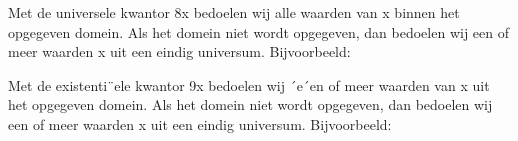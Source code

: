 \documentclass{article}
\begin{document}
	
	
	Met de universele kwantor 8x bedoelen wij alle waarden van x binnen het opgegeven
	domein. Als het domein niet wordt opgegeven, dan bedoelen wij een of meer waarden x
	uit een eindig universum. Bijvoorbeeld:
	
	
	Met de existenti¨ele kwantor 9x bedoelen wij ´e´en of meer waarden van x uit het opgegeven
	domein. Als het domein niet wordt opgegeven, dan bedoelen wij een of meer waarden x
	uit een eindig universum. Bijvoorbeeld:
	
	
	
\end{document}
